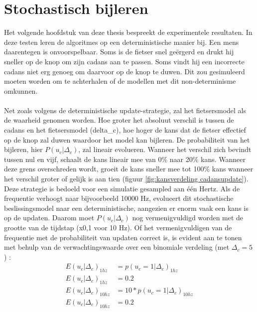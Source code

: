 \section{Stochastisch bijleren}
Het volgende hoofdstuk van deze thesis bespreekt de experimentele resultaten. In deze testen leren de algoritmes op een deterministische manier bij. Een mens daarentegen is onvoorspelbaar. Soms is de fietser snel geërgerd en drukt hij sneller op de knop om zijn cadans aan te passen. Soms vindt hij een incorrecte cadans niet erg genoeg om daarvoor op de knop te duwen. Dit zou gesimuleerd moeten worden om te achterhalen of de modellen met dit non-determinisme omkunnen. 
\\\\
Net zoals volgens de deterministische update-strategie, zal het fietsersmodel als de waarheid genomen worden. Hoe groter het absoluut verschil is tussen de cadans en het fietsersmodel (\gls{delta_c}), hoe hoger de kans dat de fietser effectief op de knop zal duwen waardoor het model kan bijleren. De probabiliteit van het bijleren, hier $P(u_c|\Delta_c)$, zal lineair evolueren. Wanneer het verschil zich bevindt tussen nul en vijf, schaalt de kans lineair mee van 0\% naar 20\% kans. Wanneer deze grens overschreden wordt, groeit de kans sneller mee tot 100\% kans wanneer het verschil groter of gelijk is aan tien (figuur \ref{fig:kansverdeling cadansupdate}). Deze strategie is bedoeld voor een simulatie gesampled aan één Hertz. Als de frequentie verhoogt naar bijvoorbeeld 10000 Hz, evolueert dit stochastische beslissingsmodel naar een deterministische, aangezien er enorm vaak een kans is op de updaten. Daarom moet $P(u_c|\Delta_c)$ nog vermenigvuldigd worden met de grootte van de tijdstap (x0,1 voor 10 Hz). Of het vermenigvuldigen van de frequentie met de probabiliteit van updaten correct is, is evident aan te tonen met behulp van de verwachtingswaarde over een binomiale verdeling (met $\Delta_c=5$) \cite{binomial wiki}:
\begin{align*}
E(u_c|\Delta_c)_{1hz} \ &=p(u_c=1|\Delta_c)_{1hz} \\
E(u_c|\Delta_c)_{1hz} \ &=0.2 \\
E(u_c|\Delta_c)_{10hz}&=10*p(u_c=1|\Delta_c)_{10hz} \\
E(u_c|\Delta_c)_{10hz}&=0.2
\end{align*}

